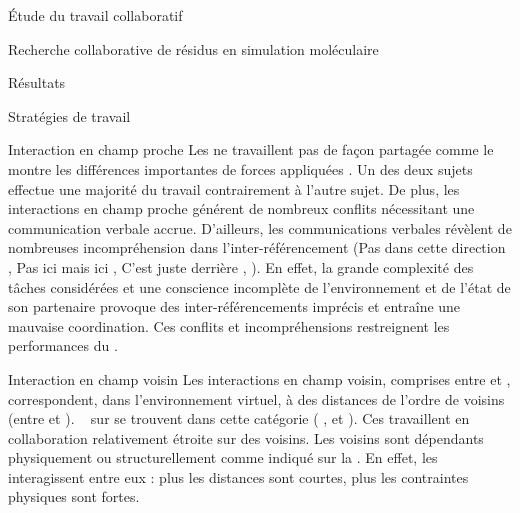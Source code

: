 \documentclass[myfrancais]{mythesis}
\begin{document}
\begin{mypart}{Étude du travail collaboratif}
\begin{mychapter}{Recherche collaborative de résidus en simulation moléculaire}
\begin{mysection}{Résultats}
\begin{mysubsection}{Stratégies de travail}
\begin{mysubsubsection}{Interaction en champ proche}
						Les  ne travaillent pas de façon partagée comme le montre les différences importantes de forces appliquées .
						Un des deux sujets effectue une majorité du travail contrairement à l'autre sujet.
						De plus, les interactions en champ proche générent de nombreux conflits nécessitant une communication verbale accrue.
						D'ailleurs, les communications verbales révèlent de nombreuses incompréhension dans l'inter-référencement (\og Pas dans cette direction \fg, \og Pas ici mais ici \fg, \og C'est juste derrière \fg, \myetc).
						En effet, la grande complexité des tâches considérées et une conscience incomplète de l'environnement et de l'état de son partenaire provoque des inter-référencements imprécis et entraîne une mauvaise coordination.
						Ces conflits et incompréhensions restreignent les performances du .
					\end{mysubsubsection}
					\begin{mysubsubsection}{Interaction en champ voisin}
						Les interactions en champ voisin, comprises entre  et , correspondent, dans l'environnement virtuel, à des distances de l'ordre de  voisins (entre  et ).
						~ sur  se trouvent dans cette catégorie ( ,  et ).
						Ces  travaillent en collaboration relativement étroite sur des  voisins.
						Les  voisins sont dépendants physiquement ou structurellement comme indiqué sur la .
						En effet, les  interagissent entre eux : plus les distances sont courtes, plus les contraintes physiques sont fortes.


\end{mysubsubsection}
\end{mysubsection}
\end{mysection}
\end{mychapter}
\end{mypart}
\end{document}
